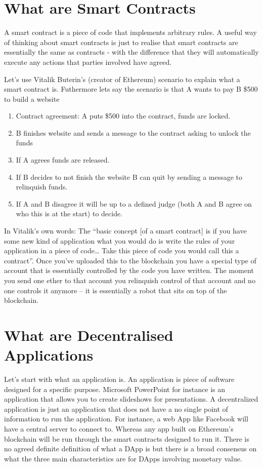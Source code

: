 \documentclass[]{book}
\providecommand{\tightlist}{%
  \setlength{\itemsep}{0pt}\setlength{\parskip}{0pt}}
\theoremstyle{definition}
\theoremstyle{definition}
\theoremstyle{definition}
\theoremstyle{remark}
\begin{document}
\section{What are Smart Contracts}\label{what-are-smart-contracts}

A smart contract is a piece of code that implements arbitrary rules. A
useful way of thinking about smart contracts is just to realise that
smart contracts are essentially the same as contracts - with the
difference that they will automatically execute any actions that parties
involved have agreed.

Let's use Vitalik Buterin's (creator of Ethereum) scenario to explain
what a smart contract is. Futhermore lets say the scenario is that A
wants to pay B \$500 to build a website

\begin{enumerate}
\def\labelenumi{\arabic{enumi}.}
\tightlist
\item
  Contract agreement: A puts \$500 into the contract, funds are locked.
\item
  B finishes website and sends a message to the contract asking to
  unlock the funds
\item
  If A agrees funds are released.
\item
  If B decides to not finish the website B can quit by sending a message
  to relinquish funds.
\item
  If A and B disagree it will be up to a defined judge (both A and B
  agree on who this is at the start) to decide.
\end{enumerate}

In Vitalik's own words: The ``basic concept {[}of a smart contract{]} is
if you have some new kind of application what you would do is write the
rules of your application in a piece of code\ldots{} Take this piece of
code you would call this a contract''. Once you've uploaded this to the
blockchain you have a special type of account that is essentially
controlled by the code you have written. The moment you send one ether
to that account you relinquish control of that account and no one
controls it anymore -- it is essentially a robot that sits on top of the
blockchain.

\section{What are Decentralised
Applications}\label{what-are-decentralised-applications}

Let's start with what an application is. An application is piece of
software designed for a specific purpose. Microsoft PowerPoint for
instance is an application that allows you to create slideshows for
presentations. A decentralized application is just an application that
does not have a no single point of information to run the application.
For instance, a web App like Facebook will have a central server to
connect to. Whereas any app built on Ethereum's blockchain will be run
through the smart contracts designed to run it. There is no agreed
definite definition of what a DApp is but there is a broad consensus on
what the three main characteristics are for DApps involving monetary
value.
\end{document}
